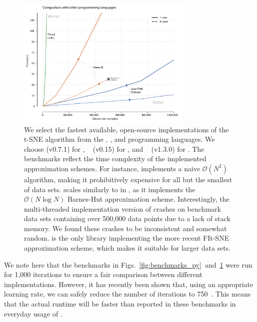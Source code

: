 \documentclass[article]{jss}
\newcommand{\opentsne}{\pkg{openTSNE}\xspace}
\begin{document}
\begin{figure}[ht]
  \centering
  \includegraphics[width=0.75\textwidth]{benchmarks_langs-final}
  \caption{\label{fig:benchmarks_lang}
  We select the fastest available, open-source implementations of the t-SNE algorithm from the , , and  programming languages. We choose \opentsne (v0.7.1) for , ~\citep{krijthe2015rtsne} (v0.15) for , and ~\citep{julia_tsne} (v1.3.0) for . The benchmarks reflect the time complexity of the implemented approximation schemes. For instance,  implements a naive $\mathcal{O}(N^2)$ algorithm, making it prohibitively expensive for all but the smallest of data sets.  scales similarly to  in , as it implements the $\mathcal{O}(N \log N)$ Barnes-Hut approximation scheme. Interestingly, the multi-threaded implementation version of  crashes on benchmark data sets containing over 500,000 data points due to a lack of stack memory. We found these crashes to be inconsistent and somewhat random. \opentsne is the only library implementing the more recent FIt-SNE approximation scheme, which makes it suitable for larger data sets. }
\end{figure}

We note here that the benchmarks in Figs.~\ref{fig:benchmarks_py}~and~\ref{fig:benchmarks_lang} were run for 1,000 iterations to ensure a fair comparison between different implementations. However, it has recently been shown that, using an appropriate learning rate, we can safely reduce the number of iterations to 750~\citep{belkina2019automated}. This means that the actual runtime will be faster than reported in these benchmarks in everyday usage of \opentsne.
\end{document}
